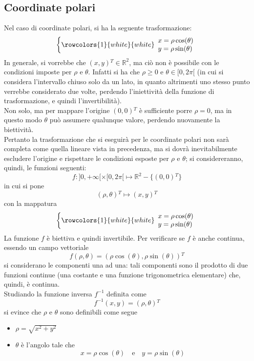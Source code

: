 \documentclass[a4paper]{extarticle}
\begin{document}
\subsection{Coordinate polari}
Nel caso di coordinate polari, si ha la seguente trasformazione:
\[
    \left\{
    \rowcolors{1}{white}{white}
    \begin{array}{l}
        x = \rho \cos(\theta)\\
        y = \rho \sin(\theta)
    \end{array}  
    \right.
\]
In generale, si vorrebbe che $(x,y){^T} \in \mathbb{R}^2$, ma ciò non è possibile con le condizioni imposte per $\rho$ e $\theta$. Infatti si ha che $\rho \geq 0$ e $\theta \in [0,2\pi[$ (in cui si considera l'intervallo chiuso solo da un lato, in quanto altrimenti uno stesso punto verrebbe considerato due volte, perdendo l'iniettività della funzione di trasformazione, e quindi l'invertibilità).\\
Non solo, ma per mappare l'origine $(0,0){^T}$ è sufficiente porre $\rho = 0$, ma in questo modo $\theta$ può assumere qualunque valore, perdendo nuovamente la biettività.\\
Pertanto la trasformazione che si eseguirà per le coordinate polari non sarà completa come quella lineare vista in precedenza, ma si dovrà inevitabilmente escludere l'origine e rispettare le condizioni esposte per $\rho$ e $\theta$; si considereranno, quindi, le funzioni seguenti:
\[f : ]0,+\infty[ \times [0,2\pi[ \longmapsto \mathbb{R}^2 - \{(0,0){^T}\}\]
in cui si pone
\[(\rho,\theta){^T} \longmapsto (x,y){^T}\]
con la mappatura 
\[
    \left\{
    \rowcolors{1}{white}{white}
    \begin{array}{l}
        x = \rho \cos(\theta)\\
        y = \rho \sin(\theta)
    \end{array}  
    \right.
\]
La funzione $f$ è biettiva e quindi invertibile. Per verificare se $f$ è anche continua, essendo un campo vettoriale
\[f(\rho,\theta) = \left(\rho \cos(\theta), \rho \sin(\theta)\right){^T}\]
si considerano le componenti una ad una: tali componenti sono il prodotto di due funzioni continue (una costante e una funzione trigonometrica elementare) che, quindi, è continua.\\
Studiando la funzione inversa $f^{-1}$ definita come
\[f^{-1}(x,y) = (\rho,\theta){^T}\]
si evince che $\rho$ e $\theta$ sono definibili come segue
\begin{itemize}
    \item $\rho=\sqrt{x^2+y^2}$
    \item $\theta$ è l'angolo tale che
    \[x=\rho \cos(\theta) \hspace{1em} \text{e} \hspace{1em} y=\rho \sin(\theta)\]
\end{itemize}
\end{document}
